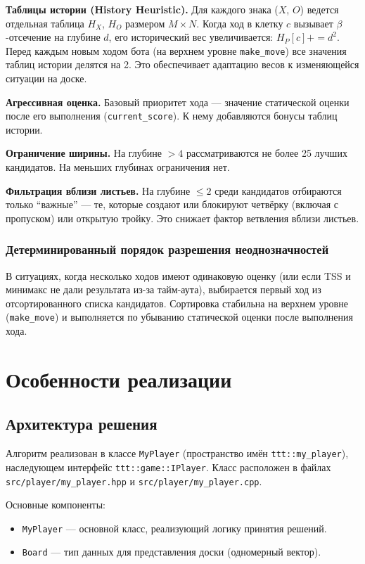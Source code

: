 \documentclass[a4paper,14pt]{extreport}
\begin{document}
\textbf{Таблицы истории (History Heuristic).} Для каждого знака ($X$, $O$) ведется отдельная таблица $H_X$, $H_O$ размером $M \times N$. Когда ход в клетку $c$ вызывает $\beta$-отсечение на глубине $d$, его исторический вес увеличивается: $H_P[c] += d^2$. Перед каждым новым ходом бота (на верхнем уровне \texttt{make\_move}) все значения таблиц истории делятся на 2. Это обеспечивает адаптацию весов к изменяющейся ситуации на доске.

\textbf{Агрессивная оценка.} Базовый приоритет хода — значение статической оценки после его выполнения (\texttt{current\_score}). К нему добавляются бонусы таблиц истории.

\textbf{Ограничение ширины.} На глубине $> 4$ рассматриваются не более 25 лучших кандидатов. На меньших глубинах ограничения нет.

\textbf{Фильтрация вблизи листьев.} На глубине $\le 2$ среди кандидатов отбираются только ``важные'' — те, которые создают или блокируют четвёрку (включая с пропуском) или открытую тройку. Это снижает фактор ветвления вблизи листьев.

\subsection{Детерминированный порядок разрешения неоднозначностей}
В ситуациях, когда несколько ходов имеют одинаковую оценку (или если TSS и минимакс не дали результата из-за тайм-аута), выбирается первый ход из отсортированного списка кандидатов. Сортировка стабильна на верхнем уровне (\texttt{make\_move}) и выполняется по убыванию статической оценки после выполнения хода.

\chapter{Особенности реализации}
\section{Архитектура решения}
Алгоритм реализован в классе \texttt{MyPlayer} (пространство имён \texttt{ttt::my\_player}), наследующем интерфейс \texttt{ttt::game::IPlayer}. Класс расположен в файлах \texttt{src/player/my\_player.hpp} и \texttt{src/player/my\_player.cpp}.

Основные компоненты:
\begin{itemize}
    \item \texttt{MyPlayer} — основной класс, реализующий логику принятия решений.
    \item \texttt{Board} — тип данных для представления доски (одномерный вектор).
\end{itemize}
\end{document}
